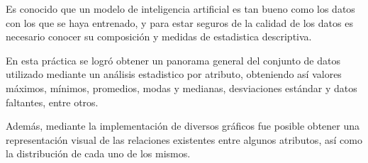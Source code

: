 Es conocido que un modelo de inteligencia artificial es tan bueno como los datos con los que se haya entrenado, y para estar seguros de la calidad de los datos es necesario conocer su composición y medidas de estadistica descriptiva.

En esta práctica se logró obtener un panorama general del conjunto de datos utilizado mediante un análisis estadistico por atributo, obteniendo así valores máximos, mínimos, promedios, modas y medianas, desviaciones estándar y datos faltantes, entre otros.

Además, mediante la implementación de diversos gráficos fue posible obtener una representación visual de las relaciones existentes entre algunos atributos, así como la distribución de cada uno de los mismos.
